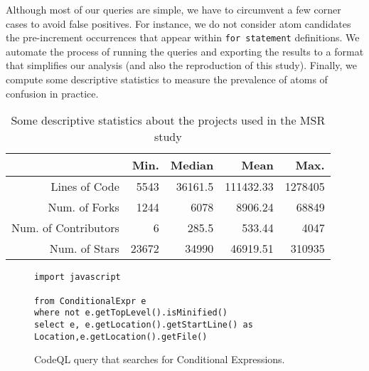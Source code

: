 Although most of our queries are simple, we have to circumvent a few corner cases to avoid false positives. For instance, we do not consider atom candidates the pre-increment occurrences that appear within
\texttt{for statement} definitions.  We automate the process of running the queries and exporting the results to a format that simplifies our analysis (and also the reproduction of this study). Finally, we compute some descriptive statistics to measure the prevalence of atoms of confusion in practice. 

\begin{table}[ht]
  \centering
   \caption{Some descriptive statistics about the projects used in the MSR study}
 \begin{tabular}{rrrrr}
   \toprule
                       & Min.             & Median        & Mean             & Max. \\ \midrule
 Lines of Code         & \num{5543}       & \num{36161.5} & \num{111432.33}  & \num{1278405} \\
 Num. of Forks         & \num{1244}       & \num{6078}    & \num{8906.24}    & \num{68849} \\
 Num. of Contributors  & \num{6}          & \num{285.5}   & \num{533.44}     & \num{4047} \\
 Num. of Stars         & \num{23672}      & \num{34990}   & \num{46919.51}   & \num{310935} \\
 
    \bottomrule
 \end{tabular}
 \label{tab:projects-statistics} 
\end{table}

\begin{figure}
\begin{lstlisting}[language=CodeQL]
import javascript

from ConditionalExpr e
where not e.getTopLevel().isMinified() 
select e, e.getLocation().getStartLine() as Location,e.getLocation().getFile()
\end{lstlisting}
\caption{CodeQL query that searches for Conditional Expressions.}
\label{lst:codeql}
\end{figure}



